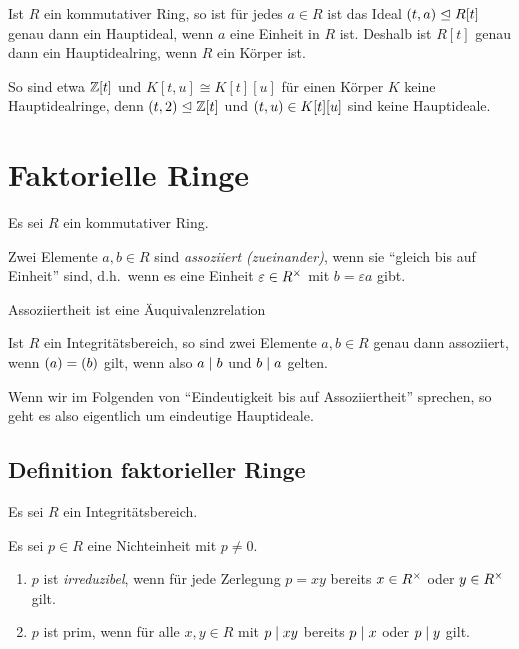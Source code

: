 \begin{remark}
  Ist $R$ ein kommutativer Ring, so ist für jedes $a \in R$ ist das Ideal $(t, a) \mathrel{\trianglelefteq} R[t]$ genau dann ein Hauptideal, wenn $a$ eine Einheit in $R$ ist.
  Deshalb ist $R[t]$ genau dann ein Hauptidealring, wenn $R$ ein Körper ist.
  
  So sind etwa $\mathbb{Z}[t]$ und $K[t,u] \cong K[t][u]$ für einen Körper $K$ keine Hauptidealringe, denn $(t, 2) \mathrel{\trianglelefteq} \mathbb{Z}[t]$ und $(t, u) \in K[t][u]$ sind keine Hauptideale.
\end{remark}









\section{Faktorielle Ringe}

Es sei $R$ ein kommutativer Ring.

\begin{definition}
  Zwei Elemente $a, b \in R$ sind \emph{assoziiert \textup(zueinander\textup)}, wenn sie \enquote{gleich bis auf Einheit} sind, d.h.\ wenn es eine Einheit $\varepsilon \in R^{\times}$ mit $b = \varepsilon a$ gibt.
\end{definition}

\begin{lemma}
  Assoziiertheit ist eine Äuquivalenzrelation
\end{lemma}

\begin{lemma}
  Ist $R$ ein Integritätsbereich, so sind zwei Elemente $a, b \in R$ genau dann assoziiert, wenn $(a) = (b)$ gilt, wenn also $a \mathrel{|} b$ und $b \mathrel{|} a$ gelten.
\end{lemma}

Wenn wir im Folgenden von \enquote{Eindeutigkeit bis auf Assoziiertheit} sprechen, so geht es also eigentlich um eindeutige Hauptideale.



\subsection{Definition faktorieller Ringe}

Es sei $R$ ein Integritätsbereich.

\begin{definition}
  Es sei $p \in R$ eine Nichteinheit mit $p \neq 0$.
  \begin{enumerate}
    \item
      $p$ ist \emph{irreduzibel}, wenn für jede Zerlegung $p = xy$ bereits $x \in R^{\times}$ oder $y \in R^{\times}$ gilt.
    \item
       $p$ ist prim, wenn für alle $x, y \in R$ mit $p \mathrel{|} xy$ bereits $p \mathrel{|} x$ oder $p \mathrel{|} y$ gilt.
  \end{enumerate}
\end{definition}

